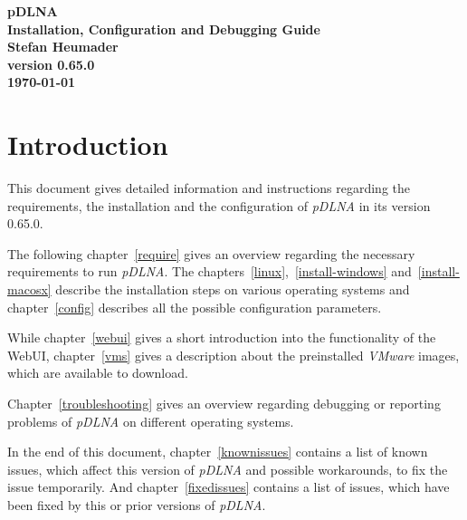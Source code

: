 \documentclass[a4paper,oneside,10pt]{report}
\newcommand{\pDLNAversion}{0.65.0}
\begin{document}
\pagestyle{empty}

\thispagestyle{empty}
\begin{center}
\Huge{\textbf{pDLNA}}\\
\vspace{0.5cm}
\Large{\textbf{Installation, Configuration and Debugging Guide}}\\
\vspace{2cm}
\large{\textbf{Stefan Heumader}}\\
\vspace{1cm}
\large{\textbf{version \pDLNAversion}}\\
\vspace{0.5cm}
\large{\textbf{\today}}\\
\end{center}

\tableofcontents
\cleardoublepage

\pagestyle{headings}

%
%

\chapter{Introduction}

This document gives detailed information and instructions regarding the requirements, the installation and the configuration of {\em pDLNA} in its version \pDLNAversion.

The following chapter~\ref{require} gives an overview regarding the necessary requirements to run {\em pDLNA}. The chapters~\ref{linux},~\ref{install-windows} and~\ref{install-macosx} describe the installation steps on various operating systems and chapter~\ref{config} describes all the possible configuration parameters.

While chapter~\ref{webui} gives a short introduction into the functionality of the WebUI, chapter~\ref{vms} gives a description about the preinstalled {\em VMware} images, which are available to download.

Chapter~\ref{troubleshooting} gives an overview regarding debugging or reporting problems of {\em pDLNA} on different operating systems.

In the end of this document, chapter~\ref{knownissues} contains a list of known issues, which affect this version of {\em pDLNA} and possible workarounds, to fix the issue temporarily. And chapter~\ref{fixedissues} contains a list of issues, which have been fixed by this or prior versions of {\em pDLNA}.
\end{document}

